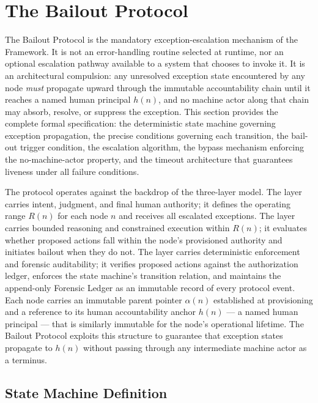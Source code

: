\section{The Bailout Protocol}\label{sec:bailout}

The Bailout Protocol is the mandatory exception-escalation mechanism of the \bxthree{} Framework. It is not an error-handling routine selected at runtime, nor an optional escalation pathway available to a system that chooses to invoke it. It is an architectural compulsion: any unresolved exception state encountered by any \bxthree{} node \emph{must} propagate upward through the immutable accountability chain until it reaches a named human principal $h(n)$, and no machine actor along that chain may absorb, resolve, or suppress the exception. This section provides the complete formal specification: the deterministic state machine governing exception propagation, the precise conditions governing each transition, the bail-out trigger condition, the escalation algorithm, the bypass mechanism enforcing the no-machine-actor property, and the timeout architecture that guarantees liveness under all failure conditions.

The protocol operates against the backdrop of the \bxthree{} three-layer model. The \purpose{} layer carries intent, judgment, and final human authority; it defines the operating range $R(n)$ for each node $n$ and receives all escalated exceptions. The \bounds{} layer carries bounded reasoning and constrained execution within $R(n)$; it evaluates whether proposed actions fall within the node's provisioned authority and initiates bailout when they do not. The \fact{} layer carries deterministic enforcement and forensic auditability; it verifies proposed actions against the authorization ledger, enforces the state machine's transition relation, and maintains the append-only Forensic Ledger as an immutable record of every protocol event. Each node carries an immutable parent pointer $\alpha(n)$ established at provisioning and a reference to its human accountability anchor $h(n)$ — a named human principal — that is similarly immutable for the node's operational lifetime. The Bailout Protocol exploits this structure to guarantee that exception states propagate to $h(n)$ without passing through any intermediate machine actor as a terminus.

\subsection{State Machine Definition}\label{sec:state-machine}

